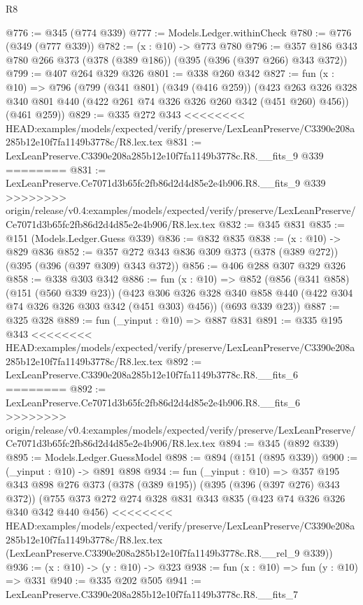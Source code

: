 \begin{lexlean}{R8}
\begin{coremodule}
{{{{{{{{{{{{{{{{{{{{{{{@776 := @345 (@774 @339)
@777 := Models.Ledger.withinCheck
@780 := @776 (@349 (@777 @339))
@782 := (x : @10) -> @773 @780
@796 := @357 @186 @343 @780 @266 @373 (@378 (@389 @186)) (@395 (@396 (@397 @266) @343 @372))
@799 := @407 @264 @329 @326
@801 := @338 @260 @342
@827 := fun (x : @10) =>
  @796
    (@799
      (@341 @801)
      (@349 (@416 @259))
      (@423 @263 @326 @328 @340 @801 @440 (@422 @261 @74 @326 @326 @260 @342 (@451 @260) @456))
      (@461 @259))
@829 := @335 @272 @343
<<<<<<<< HEAD:examples/models/expected/verify/preserve/LexLeanPreserve/C3390e208a285b12e10f7fa1149b3778c/R8.lex.tex
@831 := LexLeanPreserve.C3390e208a285b12e10f7fa1149b3778c.R8.__fits_9 @339
========
@831 := LexLeanPreserve.Ce7071d3b65fc2fb86d2d4d85e2e4b906.R8.__fits_9 @339
>>>>>>>> origin/release/v0.4:examples/models/expected/verify/preserve/LexLeanPreserve/Ce7071d3b65fc2fb86d2d4d85e2e4b906/R8.lex.tex
@832 := @345 @831
@835 := @151 (Models.Ledger.Guess @339)
@836 := @832 @835
@838 := (x : @10) -> @829 @836
@852 := @357 @272 @343 @836 @309 @373 (@378 (@389 @272)) (@395 (@396 (@397 @309) @343 @372))
@856 := @406 @288 @307 @329 @326
@858 := @338 @303 @342
@886 := fun (x : @10) =>
  @852
    (@856
      (@341 @858)
      (@151 (@560 @339 @23))
      (@423 @306 @326 @328 @340 @858 @440 (@422 @304 @74 @326 @326 @303 @342 (@451 @303) @456))
      (@693 @339 @23))
@887 := @325 @328
@889 := fun (_yinput : @10) => @887 @831
@891 := @335 @195 @343
<<<<<<<< HEAD:examples/models/expected/verify/preserve/LexLeanPreserve/C3390e208a285b12e10f7fa1149b3778c/R8.lex.tex
@892 := LexLeanPreserve.C3390e208a285b12e10f7fa1149b3778c.R8.__fits_6
========
@892 := LexLeanPreserve.Ce7071d3b65fc2fb86d2d4d85e2e4b906.R8.__fits_6
>>>>>>>> origin/release/v0.4:examples/models/expected/verify/preserve/LexLeanPreserve/Ce7071d3b65fc2fb86d2d4d85e2e4b906/R8.lex.tex
@894 := @345 (@892 @339)
@895 := Models.Ledger.GuessModel
@898 := @894 (@151 (@895 @339))
@900 := (_yinput : @10) -> @891 @898
@934 := fun (_yinput : @10) =>
  @357
    @195
    @343
    @898
    @276
    @373
    (@378 (@389 @195))
    (@395 (@396 (@397 @276) @343 @372))
    (@755
      @373
      @272
      @274
      @328
      @831
      @343
      @835
      (@423 @74 @326 @326 @340 @342 @440 @456)
<<<<<<<< HEAD:examples/models/expected/verify/preserve/LexLeanPreserve/C3390e208a285b12e10f7fa1149b3778c/R8.lex.tex
      (LexLeanPreserve.C3390e208a285b12e10f7fa1149b3778c.R8.__rel_9 @339))
@936 := (x : @10) -> (y : @10) -> @323
@938 := fun (x : @10) => fun (y : @10) => @331
@940 := @335 @202 @505
@941 := LexLeanPreserve.C3390e208a285b12e10f7fa1149b3778c.R8.__fits_7
}}}}}}}}}}}}}}}}}}}}}}}
\end{coremodule}
\end{lexlean}
